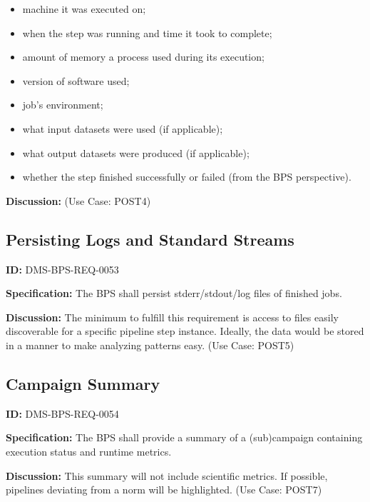 \documentclass[SE,toc,lsstdraft]{lsstdoc}
\begin{document}
    \begin{itemize}
\item
machine it was executed on;

\item
when the step was running and time it took to complete;

\item
amount of memory a process used during its execution;

\item
version of software used;

\item
job’s environment;

\item
what input datasets were used (if applicable);

\item
what output datasets were produced (if applicable);

\item
 whether the step finished successfully or failed (from the BPS perspective).

    \end{itemize}

\textbf{Discussion:}
(Use Case: POST4)

\subsection{Persisting Logs and Standard Streams}

\label{DMS-BPS-REQ-0053}
\textbf{ID:} DMS-BPS-REQ-0053

\textbf{Specification:}
The BPS shall persist stderr/stdout/log files of finished jobs.

\textbf{Discussion:}
The minimum to fulfill this requirement is access to files easily discoverable for a specific pipeline step instance.   Ideally, the data would be stored in a manner to make analyzing patterns easy. (Use Case: POST5)

\subsection{Campaign Summary}

\label{DMS-BPS-REQ-0054}
\textbf{ID:} DMS-BPS-REQ-0054

\textbf{Specification:}
The BPS shall provide a summary of a (sub)campaign containing execution status and runtime metrics.

\textbf{Discussion:}
This summary will not include scientific metrics.  If possible, pipelines deviating from a norm will be highlighted. (Use Case: POST7)
\end{document}

